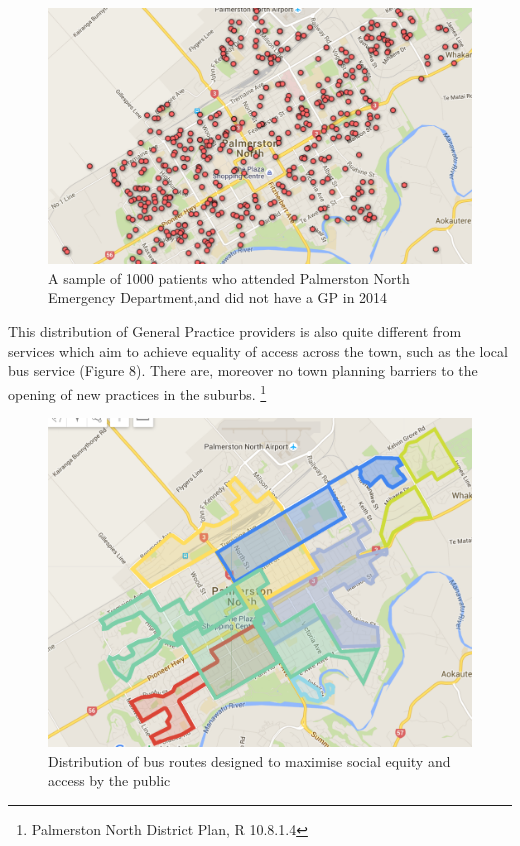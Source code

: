 \documentclass[11pt,a4paper]{article}
\begin{document}
\begin{figure}[htp]
\centering
\includegraphics[scale=0.30]{fig8.png}
\caption{A sample of 1000 patients who attended Palmerston North Emergency Department,and did not have a GP in 2014}
\label{Distribution of patients with a General Practitioner}
\end{figure}

This distribution of General Practice providers is also quite different from services which aim to achieve equality of access across the town, such as the local bus service (Figure 8). There are, moreover no town planning barriers to the opening of new practices in the suburbs. \footnote{Palmerston North District Plan, R 10.8.1.4}  \\

\begin{figure}[htp]
\centering
\includegraphics[scale=0.3]{fig9.png}
\caption{Distribution of bus routes designed to maximise social equity and access by the public}
\label{Bus routes designed to maximise equity of access}
\end{figure}
\end{document}

